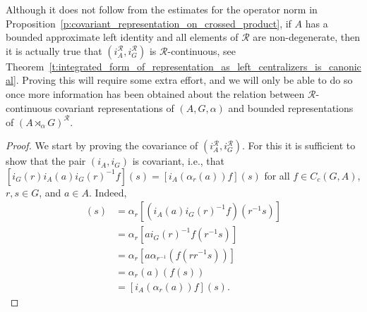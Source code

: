 \documentclass{amsart}
\theoremstyle{plain}
\theoremstyle{definition}
\numberwithin{equation}{section}
\begin{document}
Although it does not follow from the estimates for the operator norm in Proposition~\ref{p:covariant_representation_on_crossed_product}, if $A$ has a bounded approximate left identity and all elements of ${\mathcal R}$ are non-degenerate, then it is actually true that $(i_A^{\mathcal R}, i_G^{\mathcal R})$ is ${\mathcal R}$-continuous, see Theorem~\ref{t:integrated_form_of_representation_as_left_centralizers_is_canonical}. Proving this will require some extra effort, and we will only be able to do so once more information has been obtained about the relation between ${\mathcal R}$-continuous covariant representations of ${(A,G,\alpha)}$ and bounded representations of ${(A {\rtimes}_\alpha G)^\mathcal{R}}$.

\begin{proof}
We start by proving the covariance of $(i_A^{\mathcal R}, i_G^{\mathcal R})$. For this it is sufficient to show that the pair $(i_A, i_G)$ is covariant, i.e., that $[i_G(r)i_A(a)i_G(r)^{-1}f](s) = [i_A(\alpha_r(a))f](s)$ for all $f \in C_c(G,A)$, $r,s \in G$, and $a \in A$. Indeed,
\begin{align*}
 [i_G(r)i_A(a)i_G(r)^{-1}f](s) &= \alpha_r[(i_A(a)i_G(r)^{-1}f)(r^{-1}s)]\\
&=\alpha_r[ai_G(r)^{-1}f(r^{-1}s)]\\
&=\alpha_r[a\alpha_{r^{-1}}(f(rr^{-1}s))]\\
&=\alpha_r(a)(f(s))\\
&=[i_A(\alpha_r(a))f](s).
\end{align*}


\end{proof}
\end{document}
